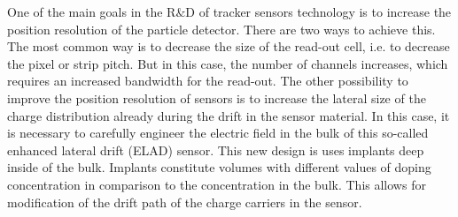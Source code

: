 One of the main goals in the R$\&$D of tracker sensors technology is to increase the position resolution of the particle detector. There are two ways to achieve this. The most common way is to decrease the size of the read-out cell, i.e. to decrease the pixel or strip pitch. But in this case, the number of channels increases, which requires an increased bandwidth for the read-out. The other possibility to improve the position resolution of sensors is to increase the lateral size of the charge distribution already during the drift in the sensor material. In this case, it is necessary to carefully engineer the electric field in the bulk of this so-called enhanced lateral drift (ELAD) sensor. This new design is uses implants deep inside of the bulk. Implants constitute volumes with different values of doping concentration in comparison to the concentration in the bulk. This allows for modification of the drift path of the charge carriers in the sensor.
